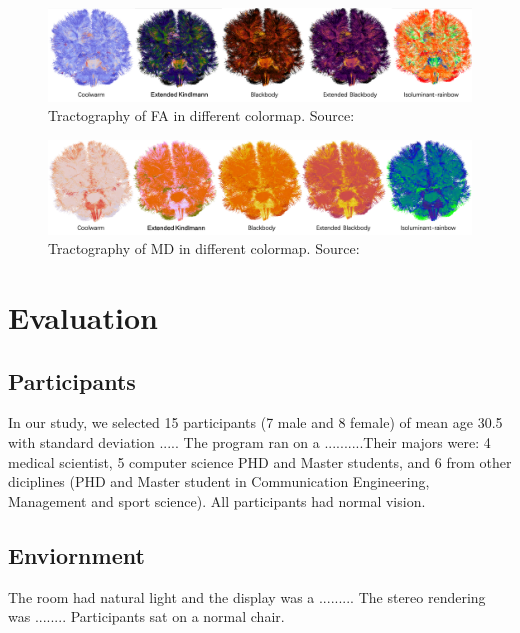 \documentclass[a4paper, 12pt]{report}
\begin{document}
\begin{figure}[ht]
    \centering
    \includegraphics[width = 0.9\columnwidth]{7}
    \caption{Tractography of FA in different colormap. Source:  \cite{???}}
    \label{fig:7}
\end{figure}

\begin{figure}[ht]
    \centering
    \includegraphics[width = 0.9\columnwidth]{8}
    \caption{Tractography of MD in different colormap. Source:  \cite{???}}
    \label{fig:8}
\end{figure}

\chapter{Evaluation}

\section{Participants }
In our study, we selected 15 participants (7 male and 8 female) of mean age 30.5 with standard deviation ..... 
The program ran on a ..........Their majors were: 4 medical scientist, 5 computer science PHD and Master students, and 6 from other diciplines (PHD and Master student in Communication Engineering, Management and sport science). All participants had normal vision. 

\section{Enviornment}
The room had natural light and the display was a ......... The stereo rendering was ........
Participants sat on a normal chair.
\end{document}
